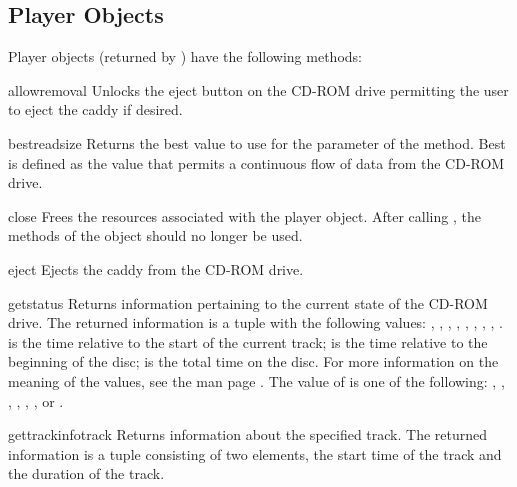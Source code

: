 \subsection{Player Objects}
\label{player-objects}

Player objects (returned by ) have the following
methods:

\begin{methoddesc}[CD player]{allowremoval}{}
Unlocks the eject button on the CD-ROM drive permitting the user to
eject the caddy if desired.
\end{methoddesc}

\begin{methoddesc}[CD player]{bestreadsize}{}
Returns the best value to use for the  parameter of
the  method.  Best is defined as the value that
permits a continuous flow of data from the CD-ROM drive.
\end{methoddesc}

\begin{methoddesc}[CD player]{close}{}
Frees the resources associated with the player object.  After calling
, the methods of the object should no longer be used.
\end{methoddesc}

\begin{methoddesc}[CD player]{eject}{}
Ejects the caddy from the CD-ROM drive.
\end{methoddesc}

\begin{methoddesc}[CD player]{getstatus}{}
Returns information pertaining to the current state of the CD-ROM
drive.  The returned information is a tuple with the following values:
, , , , ,
, , , .
 is the time relative to the start of the current track;
 is the time relative to the beginning of the disc;
 is the total time on the disc.  For more information on
the meaning of the values, see the man page .
The value of  is one of the following: ,
, , ,
, , or .
\end{methoddesc}

\begin{methoddesc}[CD player]{gettrackinfo}{track}
Returns information about the specified track.  The returned
information is a tuple consisting of two elements, the start time of
the track and the duration of the track.
\end{methoddesc}

